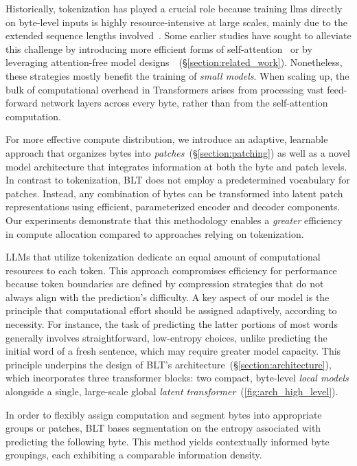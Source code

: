 Historically, tokenization has played a crucial role because training llms directly on byte-level inputs is highly resource-intensive at large scales, mainly due to the extended sequence lengths involved~\citep{xue2022byt5}. Some earlier studies have sought to alleviate this challenge by introducing more efficient forms of self-attention~\citep{el2020characterbert, clark2022canine} or by leveraging attention-free model designs~\citep{wang2024mambabyte}~(\S\ref{section:related_work}). Nonetheless, these strategies mostly benefit the training of \textit{small models}. When scaling up, the bulk of computational overhead in Transformers arises from processing vast feed-forward network layers across every byte, rather than from the self-attention computation.

For more effective compute distribution, we introduce an adaptive, learnable approach that organizes bytes into \textit{patches}~(\S\ref{section:patching}) as well as a novel model architecture that integrates information at both the byte and patch levels. In contrast to tokenization, {\textsc BLT} does not employ a predetermined vocabulary for patches. Instead, any combination of bytes can be transformed into latent patch representations using efficient, parameterized encoder and decoder components. Our experiments demonstrate that this methodology enables a \textit{greater} efficiency in compute allocation compared to approaches relying on tokenization.

LLMs that utilize tokenization dedicate an equal amount of computational resources to each token. This approach compromises efficiency for performance because token boundaries are defined by compression strategies that do not always align with the prediction's difficulty. A key aspect of our model is the principle that computational effort should be assigned adaptively, according to necessity. For instance, the task of predicting the latter portions of most words generally involves straightforward, low-entropy choices, unlike predicting the initial word of a fresh sentence, which may require greater model capacity. This principle underpins the design of {\textsc BLT}'s architecture~(\S\ref{section:architecture}), which incorporates three transformer blocks: two compact, byte-level \textit{local models} alongside a single, large-scale global \textit{latent transformer}~(\autoref{fig:arch_high_level}). 

In order to flexibly assign computation and segment bytes into appropriate groups or patches, {\textsc BLT} bases segmentation on the entropy associated with predicting the following byte. This method yields contextually informed byte groupings, each exhibiting a comparable information density.

